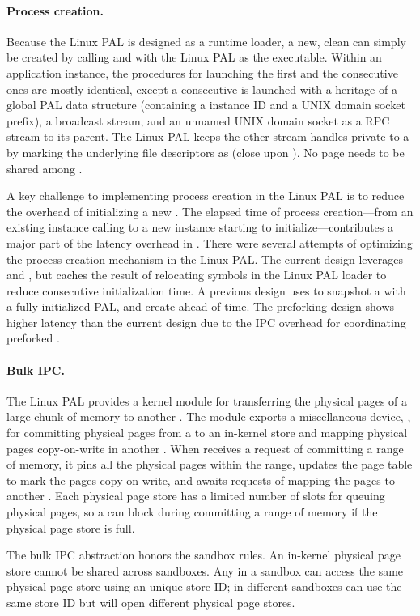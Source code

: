 \paragraph{Process creation.}
Because the Linux PAL is designed as a runtime loader,
a new, clean \picoproc{} can simply be created by calling  and  with the Linux PAL as the executable.
Within an application instance, the procedures for launching the first \picoproc{} and the consecutive ones
are mostly identical,
except a consecutive \picoproc{} is launched with a heritage of a global PAL data structure (containing a \graphene{} instance ID and a UNIX domain socket prefix), a broadcast stream,
and an unnamed UNIX domain socket as a RPC stream to its parent.
The Linux PAL keeps the other stream handles private to a \picoproc{}
by marking the underlying file descriptors
as  (close upon ).
No page needs to be shared among \picoprocs{}.


A key challenge to implementing process creation in the Linux PAL
is to reduce the overhead
of initializing a new \picoproc{}.
The elapsed time of process creation---from an existing \thelibos{} instance calling  to a new \thelibos{} instance starting to initialize---contributes a major part of the  latency overhead
in \graphene{}.
There were several attempts of optimizing the process creation mechanism
in the Linux PAL.
The current design leverages  and ,
but caches the result of relocating symbols in the Linux PAL loader to reduce consecutive \picoproc{} initialization time.
A previous design
uses  to snapshot a \picoproc{} with a fully-initialized PAL,
and create \picoprocs{} ahead of time.
The preforking design shows higher latency than the current design
due to the IPC overhead for coordinating preforked \picoprocs{}.




\paragraph{Bulk IPC.}
The Linux PAL provides a  kernel module for
transferring the physical pages of a large chunk of memory to another \picoproc{}. 
The  module exports a miscellaneous device, , for committing physical pages from a \picoproc{} to an in-kernel store and mapping physical pages copy-on-write in another \picoproc{}.
When  receives
a request of committing a range of memory, it pins all the physical pages within the range,
updates the page table to mark the pages copy-on-write,
and awaits requests of mapping the pages to another \picoproc{}.
Each physical page store has a limited number of slots for queuing physical pages,
so a \picoproc{} can block during committing a range of memory
if the physical page store is full.


The bulk IPC abstraction honors the sandbox rules. An in-kernel physical page store cannot be shared across sandboxes.
Any \picoprocs{} in a sandbox
can access the same physical page store using an unique store ID;
\picoprocs{} in different sandboxes can
use the same store ID but will open different physical page stores.


